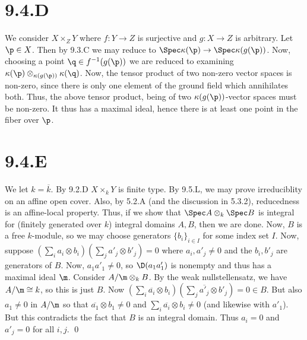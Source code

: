 \documentclass{article}
\begin{document}
\section{9.4.D}
We consider $X\times_ZY$ where $f: Y \to Z$ is surjective
and $g: X \to Z$ is arbitrary. Let $\p \in X$. Then by
9.3.C we may reduce to $\Spec \kappa(\p) \to \Spec \kappa(g(\p))$. Now, choosing a point
$\q \in f^{-1}(g(\p))$ we are reduced to examining $\kappa(\p) \otimes_{\kappa(g(\p))}\kappa(\q)$.
Now, the tensor product of two non-zero vector spaces is non-zero, since there
is only one element of the ground field which annihilates both. Thus, the above
tensor product, being of two $\kappa(g(\p))$-vector spaces must be
non-zero. It thus has a maximal ideal, hence there is at least one point in the
fiber over $\p$.

\section{9.4.E}
We let $k=\overline{k}$. By 9.2.D $X\times_kY$ is finite
type. By 9.5.L, we may prove irreduciblity on an affine open cover. Also, by
5.2.A (and the discussion in 5.3.2), reducedness is an affine-local property.
Thus, if we show that $\Spec A \otimes_k \Spec B$ is integral for (finitely
generated over $k$) integral domains
$A, B$, then we are done. Now, $B$ is a
free $k$-module, so we may choose generators
$\{b_i\}_{i \in I}$ for some index set $I$. Now,
suppose $(\sum_i a_i \otimes b_i)(\sum_j a'_j \otimes b'_j) = 0$ where $a_i, a'_j \neq 0$ and the
$b_i, b'_j$ are generators of $B$. Now,
$a_1a'_1 \neq 0$, so $\D(a_1a'_1)$ is nonempty and thus has a
maximal ideal $\m$. Consider $A/\m \otimes_k B$. By the
weak nullstellensatz, we have $A/\m \cong k$, so this is just
$B$. Now $(\sum_i \overline{a_i} \otimes b_i)(\sum_j \overline{a'_j}
	\otimes b'_j)=0 \in B$. But also
$a_1 \neq 0$ in $A/\m$ so that
$\overline{a_1}\otimes b_1 \neq 0$ and $\sum_i \overline{a_i} \otimes b_i \neq 0$ (and likewise with
$a'_1$). But this contradicts the fact that
$B$ is an integral domain. Thus $a_i = 0$ and
$a'_j=0$ for all $i, j$. \qed
\end{document}
